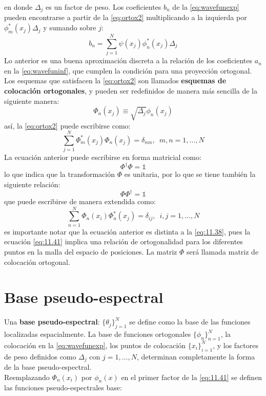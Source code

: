 en donde $\Delta_j$ es un factor de peso. Los coeficientes $b_n$ de la \autoref{eq:wavefunexp} pueden encontrarse a partir de la \autoref{eq:ortox2} multiplicando a la izquierda por $\phi_m^*(x_j)\Delta_j$ y sumando sobre $j$:
\begin{equation}
  \label{eq:11.36}
  b_n = \sum_{j=1}^N\psi(x_j)\phi_n^*(x_j)\Delta_j
\end{equation}
Lo anterior es una buena aproximación discreta a la relación de los coeficientes $a_n$ en la \autoref{eq:wavefuninf}, que cumplen la condición para una proyección ortogonal. Los esquemas que satisfacen la \autoref{eq:ortox2} son llamados \textbf{esquemas de colocación ortogonales}, y pueden ser redefinidos de manera más sencilla de la siguiente manera:
\begin{equation}
  \label{eq:11.37}
  \Phi_n(x_j) \equiv \sqrt{\Delta_j} \phi_n(x_j)
\end{equation}
así, la \autoref{eq:ortox2} puede escribirse como:
\begin{equation}
  \label{eq:11.38}
  \sum_{j=1}^N \Phi_m^*(x_j)\Phi_n(x_j) = \delta_{mn}, \,\,\, m,n=1,\dots,N
\end{equation}
La ecuación anterior puede escribirse en forma matricial como:
\begin{equation}
  \label{eq:11.39}
  \Phi^{\dag}\Phi=\mathbb{1}
\end{equation}
lo que indica que la transformación $\Phi$ es unitaria, por lo que se tiene también la siguiente relación:
\begin{equation}
  \label{eq:11.40}
  \Phi\Phi^{\dag} = \mathbb{1}
\end{equation}
que puede escribirse de manera extendida como:
\begin{equation}
  \label{eq:11.41}
  \sum_{n=1}^N \Phi_n(x_i)\Phi_n^*(x_j) = \delta_{ij}, \,\,\, i,j=1,\dots,N
\end{equation}
es importante notar que la ecuación anterior es distinta a la \autoref{eq:11.38}, pues la ecuación \autoref{eq:11.41} implica una relación de ortogonalidad para los diferentes puntos en la malla del espacio de posiciones. La matriz $\Phi$ será llamada matriz de colocación ortogonal.

\section{Base pseudo-espectral}\label{sec:ps-basis}

Una \textbf{base pseudo-espectral}: $\{\theta_j\}_{j=1}^N$ se define como la base de las funciones localizadas espacialmente. La base de funciones ortogonales $\{\phi_n\}_{n=1}^N$, la colocación en la \autoref{eq:wavefunexp}, los puntos de colocación $\{x_i\}_{i=1}^N$, y los factores de peso definidos como $\Delta_j$ con $j=1,\dots,N$, determinan completamente la forma de la base pseudo-espectral. \\
Reemplazando $\Phi_n(x_i)$ por $\phi_n(x)$ en el primer factor de la \autoref{eq:11.41} se definen las funciones pseudo-espectrales base:

